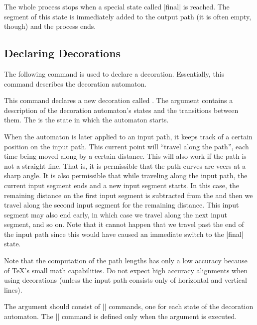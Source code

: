 The whole process stops when a special state called |final| is reached. The
segment of this state is immediately added to the output path (it is often
empty, though) and the process ends.


\subsection{Declaring Decorations}

The following command is used to declare a decoration. Essentially, this
command describes the decoration automaton.

\begin{command}{\pgfdeclaredecoration{}}
    This command declares a new decoration called . The
     argument contains a description of the decoration automaton's
    states and the transitions between them. The  is the
    state in which the automaton starts.

    When the automaton is later applied to an input path, it keeps track of a
    certain position on the input path. This current point will ``travel along
    the path'', each time being moved along by a certain distance. This will
    also work if the path is not a straight line. That is, it is permissible
    that the path curves are veers at a sharp angle.  It is also permissible
    that while traveling along the input path, the current input segment ends
    and a new input segment starts. In this case, the remaining distance on the
    first input segment is subtracted from the  and then we
    travel along the second input segment for the remaining distance. This
    input segment may also end early, in which case we travel along the next
    input segment, and so on. Note that it cannot happen that we travel past
    the end of the input path since this would have caused an immediate switch
    to the |final| state.

    Note that the computation of the path lengths has only a low accuracy
    because of \TeX's small math capabilities. Do not expect high accuracy
    alignments when using decorations (unless the input path consists only of
    horizontal and vertical lines).

    The  argument should consist of |\state| commands, one for
    each state of the decoration automaton. The |\state| command is defined
    only when the  argument is executed.


\end{command}
